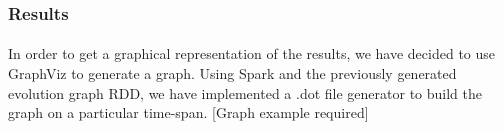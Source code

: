 \subsubsection{Results}
\label{sec:EvoGraphResults}

\paragraph{}
In order to get a graphical representation of the results, we have decided to use GraphViz to generate a graph. Using Spark and the previously generated evolution graph RDD, we have implemented a .dot file generator to build the graph on a particular time-span.
[Graph example required]
